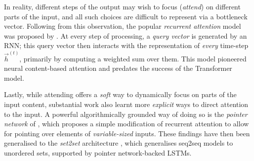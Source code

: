 In reality, different steps of the output may wish to focus (\emph{attend}) on different parts of the input, and all such choices are difficult to represent via a bottleneck vector. Following from this observation, the popular \emph{recurrent attention} model was proposed by \citet{bahdanau2014neural}. At every step of processing, a \emph{query vector} is generated by an RNN; this query vector then interacts with the representation of \emph{every} time-step $\vec{h}^{(t)}$, primarily by computing a weighted sum over them. This model pioneered neural content-based attention and predates the success of the Transformer model.

Lastly, while attending offers a \emph{soft} way to dynamically focus on parts of the input content, substantial work also learnt more \emph{explicit} ways to direct attention to the input. A powerful algorithmically grounded way of doing so is the \emph{pointer network} of \citet{vinyals2015pointer}, which proposes a simple modification of recurrent attention to allow for pointing over elements of \emph{variable-sized} inputs. These findings have then been generalised to the \emph{set2set} architecture \citep{vinyals2016order}, which generalises seq2seq models to unordered sets, supported by pointer network-backed LSTMs.